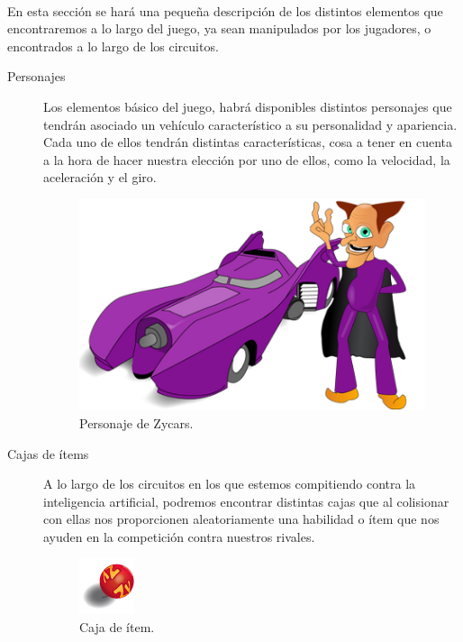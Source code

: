 \documentclass[a4paper,11pt]{article} %
\begin{document}
\paragraph{}
En esta sección se hará una pequeña descripción de los distintos elementos que encontraremos a lo largo del juego, ya sean 
manipulados por los jugadores, o encontrados a lo largo de los circuitos.


\begin{description}

\item [Personajes]
Los elementos básico del juego, habrá disponibles distintos personajes que tendrán asociado un 
vehículo característico a su personalidad y apariencia. Cada uno de ellos
tendrán distintas características, 
cosa a tener en cuenta a la hora de hacer nuestra elección por uno de ellos, como la velocidad, la aceleración y el giro.
	
\begin{figure}[H]
	\label{ejemplo_personaje2}
	\begin{center}
		\includegraphics[scale=0.4]{imagenes/ejemplo_personaje2.png}
	\end{center}
	\caption{Personaje de Zycars.}
\end{figure}

\item [Cajas de ítems]
A lo largo de los circuitos en los que estemos compitiendo contra la inteligencia artificial, 
podremos encontrar distintas cajas que al colisionar con ellas nos proporcionen
aleatoriamente una habilidad o ítem que nos
ayuden en la competición contra nuestros rivales.

\begin{figure}[H]
	\label{item_box}
	\begin{center}
		\includegraphics[scale=0.85]{imagenes/items/item_box.png}
	\end{center}
	\caption{Caja de ítem.}
\end{figure}


\end{description}
\end{document}

